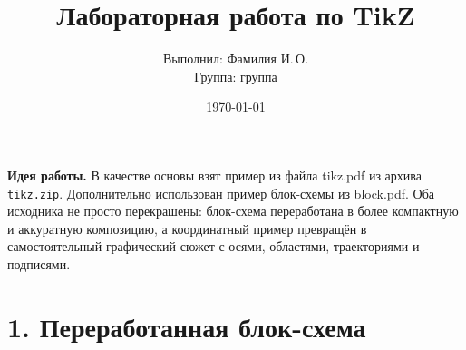 \documentclass[a4paper,12pt]{article}
\author{Выполнил: Фамилия И.\,О.\\Группа: группа}
\title{Лабораторная работа по TikZ}
\date{\today}
\begin{document}
\maketitle

\textbf{Идея работы.} В качестве основы взят пример из файла tikz.pdf из архива \texttt{tikz.zip}. Дополнительно использован пример блок-схемы из block.pdf. Оба исходника не просто перекрашены: блок-схема переработана в более компактную и аккуратную композицию, а координатный пример превращён в самостоятельный графический сюжет с осями, областями, траекториями и подписями.

\section*{1. Переработанная блок-схема}
\end{document}

